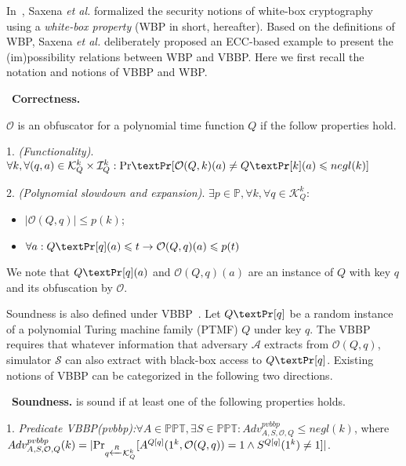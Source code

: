 \documentclass{SCIS2018}
\begin{document}
In~\cite{DBLP:conf/isw/SaxenaWP09}, Saxena \textit{et al.} formalized the security notions of white-box cryptography using a \textit{white-box property} (WBP in short, hereafter). Based on the definitions of WBP, Saxena \textit{et al.} deliberately proposed an ECC-based example to present the (im)possibility relations between WBP and VBBP. Here we first recall the notation and notions of VBBP and WBP.

\cite{DBLP:conf/isw/SaxenaWP09}~\textbf{Correctness.}{$\mathcal{O}$ is an obfuscator for a polynomial time function $Q$ if the follow properties hold.
\begin{numerate}

\item 1. \textit{(Functionality)}. $\forall k, \forall (q,a)\in \mathcal{K}^{k}_{Q}\times \mathcal{I}^{k}_{Q}:\textmd{Pr}\textPr[\mathcal{O}(Q,k)(a)\neq Q\textPr[k](a)\leq negl(k)]$

\item 2. \textit{(Polynomial slowdown and expansion)}. $\exists p \in \mathbb{P}, \forall k, \forall q \in \mathcal{K}^{k}_{Q}:$
\begin{itemize}
    \item $|\mathcal{O}(Q, q)| \leq p(k)$;
    \item $\forall a: Q\textPr[q](a) \leq t \rightarrow \mathcal{O}(Q,q)(a) \leq p(t)$
\end{itemize}
\end{numerate}

We note that $Q\textPr[q](a)$ and $\mathcal{O}(Q,q)(a)$ are an instance of $Q$ with key $q$ and its obfuscation by $\mathcal{O}$.

Soundness is also defined under VBBP~\cite{DBLP:conf/crypto/BarakGIRSVY01}. Let $Q\textPr[q]$ be a random instance of a polynomial Turing machine family (PTMF) $Q$ under key $q$. The VBBP requires that whatever information that adversary $\mathcal{A}$ extracts from $\mathcal{O}(Q,q)$, simulator $\mathcal{S}$ can also extract with black-box access to $Q\textPr[q]$. Existing notions of VBBP can be categorized in the following two directions.

\cite{DBLP:conf/isw/SaxenaWP09}~\textbf{Soundness.}{ is sound if at least one of the following properties holds.}
\begin{numerate}
\item 1. \textit{Predicate VBBP(pvbbp):}$\forall A\in \mathbb{PPT}, \exists S \in \mathbb{PPT}: Adv_{A, S, \mathcal{O}, Q}^{pvbbp} \leq negl(k)$, where \\ $Adv_{A, S, \mathcal{O}, Q}^{pvbbp}(k) =|\textmd{Pr}_{q \xleftarrow{R} \mathcal{K}^{k}_{Q}}[A^{Q[q]}(1^{k},\mathcal{O}(Q,q))=1 \wedge S^{Q[q]}(1^{k})\neq 1]|$.


\end{numerate}}
\end{document}
